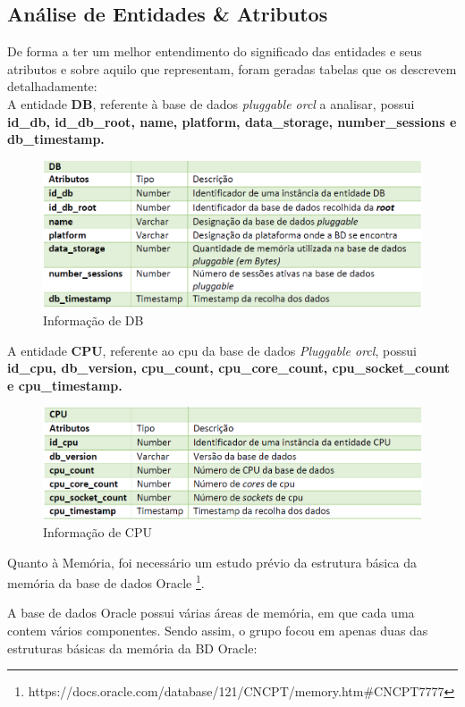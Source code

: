 \documentclass[a4paper]{article}
\begin{document}
\subsection{Análise de Entidades \& Atributos}
De forma a ter um melhor entendimento do significado das entidades e seus atributos e sobre aquilo que representam, foram geradas tabelas que os descrevem detalhadamente:\\

A entidade \textbf{DB}, referente à base de dados \emph{pluggable orcl} a analisar, possui \textbf{id\_db, id\_db\_root, name, platform, data\_storage, number\_sessions e db\_timestamp.}

\begin{figure}[H]
\centering
\includegraphics[scale=0.65]{db.PNG}
\caption{Informação de DB}
\end{figure}

A entidade \textbf{CPU}, referente ao cpu da base de dados \emph{Pluggable orcl}, possui \textbf{id\_cpu, db\_version, cpu\_count, cpu\_core\_count, cpu\_socket\_count e cpu\_timestamp.}

\begin{figure}[H]
\centering
\includegraphics[scale=0.65]{cpu.PNG}
\caption{Informação de CPU}
\end{figure}

Quanto à Memória, foi necessário um estudo prévio da estrutura básica da memória da base de dados Oracle \footnote{https://docs.oracle.com/database/121/CNCPT/memory.htm#CNCPT7777}.

A base de dados Oracle possui várias áreas de memória, em que cada uma contem vários componentes. Sendo assim, o grupo focou em apenas duas das estruturas básicas da memória da BD Oracle:
\end{document}
